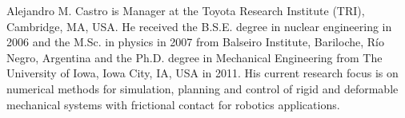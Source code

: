 \begin{IEEEbiography}{Alejandro
M. Castro} is Manager at the Toyota Research Institute (TRI), Cambridge, MA, USA.
He received the B.S.E. degree in nuclear engineering in 2006 and the M.Sc. in
physics in 2007 from Balseiro Institute, Bariloche, R\'io Negro, Argentina and
the Ph.D. degree in Mechanical Engineering from The University of Iowa,
Iowa City, IA, USA in 2011. His current research focus is on numerical methods
for simulation, planning and control of rigid and deformable mechanical systems
with frictional contact for robotics applications.
\end{IEEEbiography}
